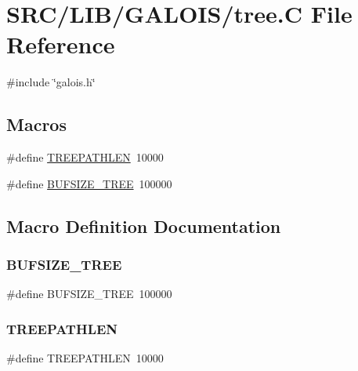 \hypertarget{tree_8_c}{}\section{S\+R\+C/\+L\+I\+B/\+G\+A\+L\+O\+I\+S/tree.C File Reference}
\label{tree_8_c}
{\ttfamily \#include \char`\"{}galois.\+h\char`\"{}}\newline
\subsection*{Macros}
\begin{DoxyCompactItemize}
\item 
\#define \mbox{\hyperlink{tree_8_c_afb3bebf245a71060f1fd00b2787f3d7d}{T\+R\+E\+E\+P\+A\+T\+H\+L\+EN}}~10000
\item 
\#define \mbox{\hyperlink{tree_8_c_a8ba4d390e9de0ab81db984137af0172d}{B\+U\+F\+S\+I\+Z\+E\+\_\+\+T\+R\+EE}}~100000
\end{DoxyCompactItemize}


\subsection{Macro Definition Documentation}
\mbox{\label{tree_8_c_a8ba4d390e9de0ab81db984137af0172d}} 
\subsubsection{\texorpdfstring{B\+U\+F\+S\+I\+Z\+E\+\_\+\+T\+R\+EE}{BUFSIZE\_TREE}}
{\footnotesize\ttfamily \#define B\+U\+F\+S\+I\+Z\+E\+\_\+\+T\+R\+EE~100000}

\mbox{\label{tree_8_c_afb3bebf245a71060f1fd00b2787f3d7d}} 
\subsubsection{\texorpdfstring{T\+R\+E\+E\+P\+A\+T\+H\+L\+EN}{TREEPATHLEN}}
{\footnotesize\ttfamily \#define T\+R\+E\+E\+P\+A\+T\+H\+L\+EN~10000}

